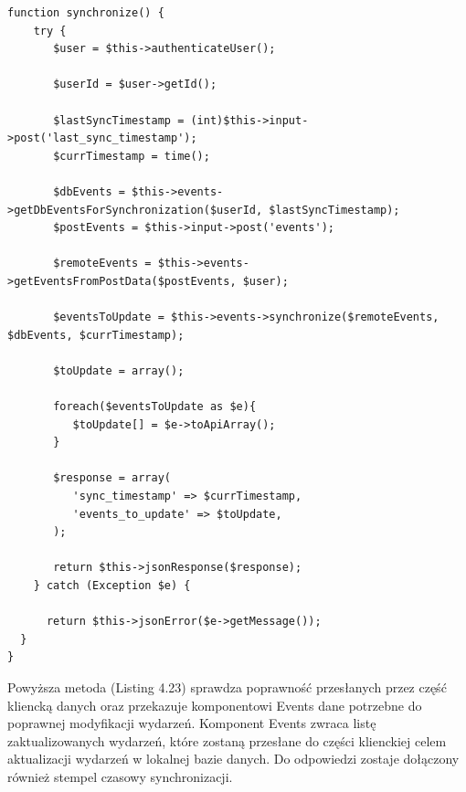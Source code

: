 \begin{lstlisting}[caption=Metoda synchronize interfejsu programowania Events\_api., label=amb, captionpos=b]
function synchronize() {
   	try {
	   $user = $this->authenticateUser();

       $userId = $user->getId();

       $lastSyncTimestamp = (int)$this->input->post('last_sync_timestamp');
       $currTimestamp = time();

       $dbEvents = $this->events->getDbEventsForSynchronization($userId, $lastSyncTimestamp);       	 
       $postEvents = $this->input->post('events');

       $remoteEvents = $this->events->getEventsFromPostData($postEvents, $user);
      	 
       $eventsToUpdate = $this->events->synchronize($remoteEvents, $dbEvents, $currTimestamp);

       $toUpdate = array();
       	 
       foreach($eventsToUpdate as $e){
          $toUpdate[] = $e->toApiArray();
       }

       $response = array(
          'sync_timestamp' => $currTimestamp,
          'events_to_update' => $toUpdate,
       );

       return $this->jsonResponse($response);
    } catch (Exception $e) {

      return $this->jsonError($e->getMessage());
  }
}

\end{lstlisting}

Powyższa metoda (Listing 4.23) sprawdza poprawność przesłanych przez część kliencką danych oraz przekazuje komponentowi Events dane potrzebne do poprawnej modyfikacji wydarzeń. Komponent Events zwraca listę zaktualizowanych wydarzeń, które zostaną przesłane do części klienckiej celem aktualizacji wydarzeń w lokalnej bazie danych. Do odpowiedzi zostaje dołączony również stempel czasowy synchronizacji.

